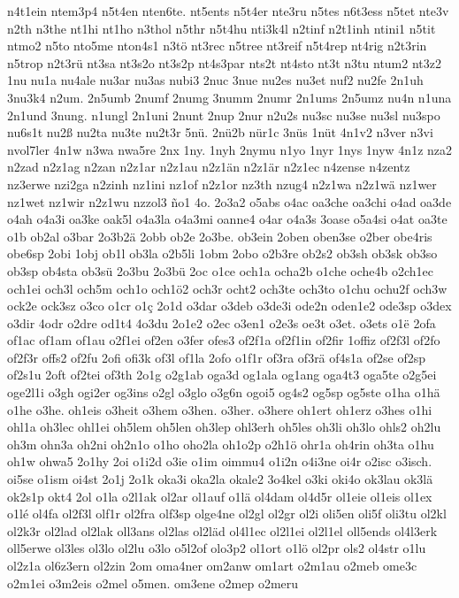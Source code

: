 {n4t1ein
ntem3p4
n5t4en
nten6te.
nt5ents
n5t4er
nte3ru
n5tes
n6t3ess
n5tet
nte3v
n2th
n3the
nt1hi
nt1ho
n3thol
n5thr
n5t4hu
nti3k4l
n2tinf
n2t1inh
ntini1
n5tit
ntmo2
n5to
nto5me
nton4s1
n3tö
nt3rec
n5tree
nt3reif
n5t4rep
nt4rig
n2t3rin
n5trop
n2t3rü
nt3sa
nt3s2o
nt3s2p
nt4s3par
nts2t
nt4sto
nt3t
n3tu
ntum2
nt3z2
1nu
nu1a
nu4ale
nu3ar
nu3as
nubi3
2nuc
3nue
nu2es
nu3et
nuf2
nu2fe
2n1uh
3nu3k4
n2um.
2n5umb
2numf
2numg
3numm
2numr
2n1ums
2n5umz
nu4n
n1una
2n1und
3nung.
n1ungl
2n1uni
2nunt
2nup
2nur
n2u2s
nu3sc
nu3se
nu3sl
nu3spo
nu6s1t
nu2ß
nu2ta
nu3te
nu2t3r
5nü.
2nü2b
nür1c
3nüs
1nüt
4n1v2
n3ver
n3vi
nvol7ler
4n1w
n3wa
nwa5re
2nx
1ny.
1nyh
2nymu
n1yo
1nyr
1nys
1nyw
4n1z
nza2
n2zad
n2z1ag
n2zan
n2z1ar
n2z1au
n2z1än
n2z1är
n2z1ec
n4zense
n4zentz
nz3erwe
nzi2ga
n2zinh
nz1ini
nz1of
n2z1or
nz3th
nzug4
n2z1wa
n2z1wä
nz1wer
nz1wet
nz1wir
n2z1wu
nzzol3
ño1
4o.
2o3a2
o5abs
o4ac
oa3che
oa3chi
o4ad
oa3de
o4ah
o4a3i
oa3ke
oak5l
o4a3la
o4a3mi
oanne4
o4ar
o4a3s
3oase
o5a4si
o4at
oa3te
o1b
ob2al
o3bar
2o3b2ä
2obb
ob2e
2o3be.
ob3ein
2oben
oben3se
o2ber
obe4ris
obe6sp
2obi
1obj
ob1l
ob3la
o2b5li
1obm
2obo
o2b3re
ob2s2
ob3sh
ob3sk
ob3so
ob3sp
ob4sta
ob3sü
2o3bu
2o3bü
2oc
o1ce
och1a
ocha2b
o1che
oche4b
o2ch1ec
och1ei
och3l
och5m
och1o
och1ö2
och3r
ocht2
och3te
och3to
o1chu
ochu2f
och3w
ock2e
ock3sz
o3co
o1cr
o1ç
2o1d
o3dar
o3deb
o3de3i
ode2n
oden1e2
ode3sp
o3dex
o3dir
4odr
o2dre
od1t4
4o3du
2o1e2
o2ec
o3en1
o2e3s
oe3t
o3et.
o3ets
o1ë
2ofa
of1ac
of1am
of1au
o2f1ei
of2en
o3fer
ofes3
of2f1a
of2f1in
of2fir
1offiz
of2f3l
of2fo
of2f3r
offs2
of2fu
2ofi
ofi3k
of3l
of1la
2ofo
o1f1r
of3ra
of3rä
of4s1a
of2se
of2sp
of2s1u
2oft
of2tei
of3th
2o1g
o2g1ab
oga3d
og1ala
og1ang
oga4t3
oga5te
o2g5ei
oge2l1i
o3gh
ogi2er
og3ins
o2gl
o3glo
o3g6n
ogoi5
og4s2
og5sp
og5ste
o1ha
o1hä
o1he
o3he.
oh1eis
o3heit
o3hem
o3hen.
o3her.
o3here
oh1ert
oh1erz
o3hes
o1hi
ohl1a
oh3lec
ohl1ei
oh5lem
oh5len
oh3lep
ohl3erh
oh5les
oh3li
oh3lo
ohls2
oh2lu
oh3m
ohn3a
oh2ni
oh2n1o
o1ho
oho2la
oh1o2p
o2h1ö
ohr1a
oh4rin
oh3ta
o1hu
oh1w
ohwa5
2o1hy
2oi
o1i2d
o3ie
o1im
oimmu4
o1i2n
o4i3ne
oi4r
o2isc
o3isch.
oi5se
o1ism
oi4st
2o1j
2o1k
oka3i
oka2la
okale2
3o4kel
o3ki
oki4o
ok3lau
ok3lä
ok2s1p
okt4
2ol
o1la
o2l1ak
ol2ar
ol1auf
o1lä
ol4dam
ol4d5r
ol1eie
ol1eis
ol1ex
o1lé
ol4fa
ol2f3l
olf1r
ol2fra
olf3sp
olge4ne
ol2gl
ol2gr
ol2i
oli5en
oli5f
oli3tu
ol2kl
ol2k3r
ol2lad
ol2lak
oll3ans
ol2las
ol2läd
ol4l1ec
ol2l1ei
ol2l1el
oll5ends
ol4l3erk
oll5erwe
ol3les
ol3lo
ol2lu
o3lo
o5l2of
olo3p2
ol1ort
o1lö
ol2pr
ols2
ol4str
o1lu
ol2z1a
ol6z3ern
ol2zin
2om
oma4ner
om2anw
om1art
o2m1au
o2meb
ome3c
o2m1ei
o3m2eis
o2mel
o5men.
om3ene
o2mep
o2meru
}
